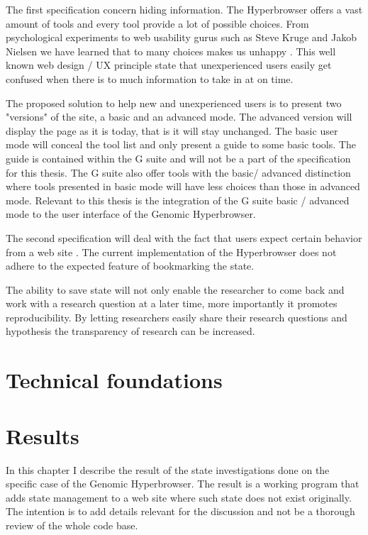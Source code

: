 \documentclass[english]{ifimaster}
\begin{document}
The first specification concern hiding information. The Hyperbrowser offers a vast amount of tools and every tool provide a lot of possible choices. From psychological experiments to web usability gurus such as Steve Kruge and Jakob Nielsen we have learned that to many choices makes us unhappy\parencite{schwartz2004paradox} \parencite{krug2005don} \parencite{nielsen1997user}. This well known web design / UX principle state that unexperienced users easily get confused when there is to much information to take in at on time.

The proposed solution to help new and unexperienced users is to present two "versions" of the site, a basic and an advanced mode. The advanced version will display the page as it is today, that is it will stay unchanged. The basic user mode will conceal the tool list and only present a guide to some basic tools. The guide is contained within the G suite and will not be a part of the specification for this thesis. The G suite also offer tools with the basic/ advanced distinction where tools presented in basic mode will have less choices than those in advanced mode. 
Relevant to this thesis is the integration of the G suite basic / advanced mode to the user interface of the Genomic Hyperbrowser. 

The second specification will deal with the fact that users expect certain behavior from a web site \parencite{mikowski} \parencite{nielsen1997user}. The current implementation of the Hyperbrowser does not adhere to the expected feature of bookmarking the state. 

The ability to save state will not only enable the researcher to come back and work with a research question at a later time, more importantly it promotes reproducibility. By letting researchers easily share their research questions and hypothesis the transparency of research can be increased. 

\chapter{Technical foundations}
\chapter{Results}
In this chapter I describe the result of the state investigations done on the specific case of the Genomic Hyperbrowser. The result is a working program that adds state management to a web site where such state does not exist originally. The intention is to add details relevant for the discussion and not be a thorough review of the whole code base.
\end{document}
